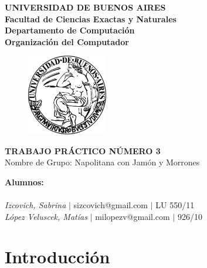 \documentclass[10pt, a4paper]{article}
\begin{document}
\thispagestyle{empty}
\begin{center}

\Huge{ \bf{UNIVERSIDAD DE BUENOS AIRES}}
\\
\LARGE{\bf{Facultad de Ciencias Exactas y Naturales}}
\\
\textbf{Departamento de Computaci\'on}
\\
\textbf{Organizaci\'on del Computador}
\vspace{2.0\baselineskip}
\end{center}


\begin{figure}[h] %
\begin{center}
\includegraphics[width=100pt]{./image.jpeg}
\end{center}
\end{figure}
\begin{center}
\vspace*{0.7cm}

\huge{\bf TRABAJO PR\'ACTICO N\'UMERO 3}\\
\huge{Nombre de Grupo: Napolitana con Jam\'on y Morrones}
\vspace*{8cm}

\end{center}

\huge{\textbf{Alumnos:}}\\
\\
\vspace*{0.3cm}
\Large{\textsl{Izcovich, Sabrina} $|$ sizcovich@gmail.com $|$ LU 550/11}\\
\vspace*{0.3cm}
\Large{\textsl{L\'opez Veluscek, Matías} \hspace{0.1cm}$|$ milopezv@gmail.com $|$ 926/10}\\
\vspace*{0.3cm}
\vspace{0.5cm}
 
\newpage
\thispagestyle{empty}
\tableofcontents
\newpage
\section{Introducci\'on}
\end{document}
